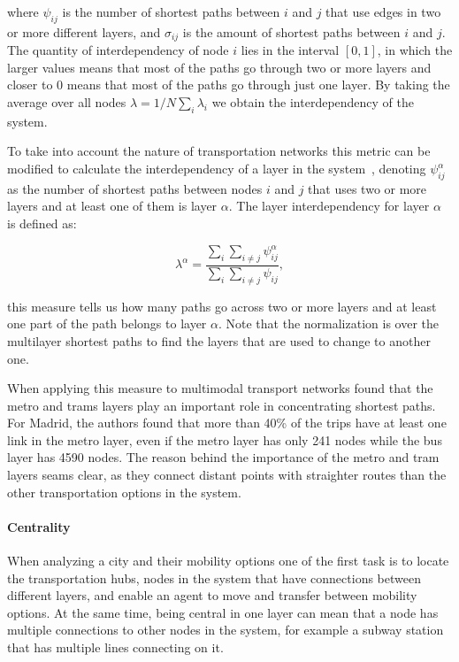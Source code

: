 where $\psi_{ij}$ is the number of shortest paths between $i$ and $j$ that use edges in two or more different layers, and $\sigma_{ij}$ is the amount of shortest paths between $i$ and $j$. The quantity of interdependency of node $i$ lies in the interval $[0, 1]$, in which the larger values means that most of the paths go through two or more layers and closer to $0$ means that most of the paths go through just one layer. By taking the average over all nodes $\lambda = 1/N \sum_i\lambda_i$ we obtain the interdependency of the system. 

To take into account the nature of transportation networks this metric can be modified to calculate the interdependency of a layer in the system~\cite{Aleta2017Multilayer}, denoting $\psi_{ij}^\alpha$ as the number of shortest paths between nodes $i$ and $j$ that uses two or more layers and at least one of them is layer $\alpha$. The layer interdependency for layer $\alpha$ is defined as:

\begin{equation}\label{eq:layer_interdependency}
    \lambda^{\alpha}=\frac{\sum_i\sum_{i\neq j}\psi_{ij}^{\alpha}}{\sum_i\sum_{i\neq j}\psi_{ij}},
\end{equation}

this measure tells us how many paths go across two or more layers and at least one part of the path belongs to layer $\alpha$. Note that the normalization is over the multilayer shortest paths to find the layers that are used to change to another one.

When applying this measure to multimodal transport networks \cite{Aleta2017Multilayer} found that the metro and trams layers play an important role in concentrating shortest paths. For Madrid, the authors found that more than 40\% of the trips have at least one link in the metro layer, even if the metro layer has only 241 nodes while the bus layer has 4590 nodes. The reason behind the importance of the metro and tram layers seams clear, as they connect distant points with straighter routes than the other transportation options in the system.

\paragraph*{Centrality}
When analyzing a city and their mobility options one of the first task is to locate the transportation hubs, nodes in the system that have connections between different layers, and enable an agent to move and transfer between mobility options. At the same time, being central in one layer can mean that a node has multiple connections to other nodes in the system, for example a subway station that has multiple lines connecting on it.

